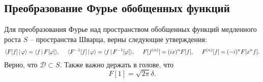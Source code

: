 \subsection{Преобразование Фурье обобщенных функций}


Для преобразования Фурье над пространством обобщенных функций медленного роста $S$ -- пространства Шварца, верны следующие утверждения:
\begin{equation*}
    \langle F[f] \,|\, \varphi \rangle  = \langle f \,|\, F[\varphi] \rangle,
    \hspace{5 mm}   
    \langle F^{-1}[f] \,|\, \varphi \rangle = \langle f \,|\, F^{-1}[\varphi] \rangle,
    \hspace{5 mm} 
    F[f^{(n)}] = (ix)^n F[f],
    \hspace{5 mm}   
    F^{(n)} [f] = (-i)^n F[x^n f].
\end{equation*}
Верно, что $\mathcal D \subset S$. Также важно держать в голове, что
\begin{equation*}
    F[1] = \sqrt{2\pi} \delta.
\end{equation*}






